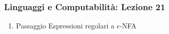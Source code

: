 




\begin{frame}[fragile]
	\frametitle{Linguaggi e Computabilità: Lezione 21}
\begin{enumerate}
\item
Passaggio Espressioni regolari a $\epsilon$-NFA
\end{enumerate}
\end{frame}



